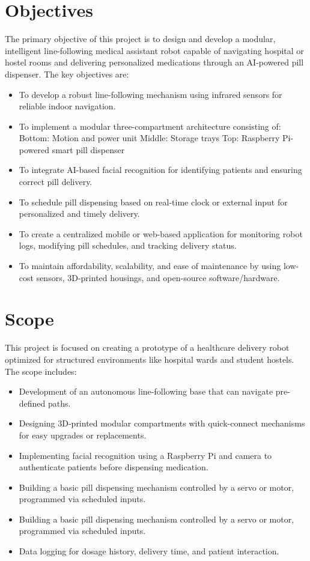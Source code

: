 \section{Objectives}
The primary objective of this project is to design and develop a modular, intelligent line-following medical assistant robot capable of navigating hospital or hostel rooms and delivering personalized medications through an AI-powered pill dispenser. The key objectives are:
\begin{itemize}
    
    \item To develop a robust line-following mechanism using infrared sensors for reliable indoor navigation.
    \item To implement a modular three-compartment architecture consisting of:
    \subitem Bottom: Motion and power unit
    \subitem Middle: Storage trays
    \subitem Top: Raspberry Pi-powered smart pill dispenser
    \item To integrate AI-based facial recognition for identifying patients and ensuring correct pill delivery.
    \item To schedule pill dispensing based on real-time clock or external input for personalized and timely delivery.
    \item To create a centralized mobile or web-based application for monitoring robot logs, modifying pill schedules, and tracking delivery status.
    \item To maintain affordability, scalability, and ease of maintenance by using low-cost sensors, 3D-printed housings, and open-source software/hardware.
\end{itemize}

\vspace{1.5\baselineskip} 

\section{Scope}
This project is focused on creating a prototype of a healthcare delivery robot optimized for structured environments like hospital wards and student hostels. The scope includes:
\begin{itemize}
    \item Development of an autonomous line-following base that can navigate pre-defined paths.
    \item Designing 3D-printed modular compartments with quick-connect mechanisms for easy upgrades or replacements.
    \item Implementing facial recognition using a Raspberry Pi and camera to authenticate patients before dispensing medication.
    \item Building a basic pill dispensing mechanism controlled by a servo or motor, programmed via scheduled inputs.
    \item Building a basic pill dispensing mechanism controlled by a servo or motor, programmed via scheduled inputs.
    \item Data logging for dosage history, delivery time, and patient interaction.
\end{itemize}
\vspace{1.5\baselineskip}
